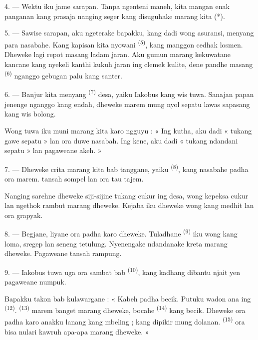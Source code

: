4. --- Wektu iku jame sarapan. Tanpa ngenteni maneh, kita mangan enak
panganan kang prasaja nanging seger kang disuguhake marang kita (*).

\VUsaut{3.0mm}
\VUsaut{3.0mm}

5. --- Sawise sarapan, aku ngeterake bapakku, kang dadi wong asuransi,
menyang para nasabahe. Kang kapisan kita nyowani 
\textsuperscript{(5)}, kang manggon cedhak losmen. Dheweke lagi repot
masang ladam jaran. Aku gumun marang kekuwatane kancane kang nyekeli
kanthi kukuh  jaran ing clemek kulite, dene pandhe masang
 \textsuperscript{(6)} nganggo gebugan palu kang santer.

6. --- Banjur kita menyang  \textsuperscript{(7)}
desa, yaiku Iakobus kang wis tuwa. Sanajan papan jenenge nganggo
 kang endah, dheweke marem mung nyol sepatu lawas
sapasang kang wis bolong.

Wong tuwa iku muni marang kita karo ngguyu : « Ing kutha, aku dadi
« tukang gawe sepatu » lan ora duwe nasabah. Ing kene, aku dadi
« tukang ndandani sepatu » lan pagaweane akeh. »

7. --- Dheweke crita marang kita bab tanggane, yaiku  \textsuperscript{(8)}, kang nasabahe padha ora marem.
 tansah sompel lan  ora tau
tajem.

Nanging sarehne dheweke siji-sijine tukang cukur ing desa, wong kepeksa
cukur lan ngethok rambut marang dheweke. Kejaba iku dheweke wong kang
medhit lan ora grapyak.

8. --- Begjane,  liyane ora padha karo dheweke. Tuladhane
 \textsuperscript{(9)} iku wong kang loma, sregep lan
seneng tetulung. Nyenengake ndandanake kreta marang dheweke.
Pagaweane tansah rampung.

9. --- Iakobus tuwa uga ora sambat bab 
\textsuperscript{(10)}, kang kadhang dibantu njait 
yen pagaweane numpuk.

Bapakku takon bab kulawargane : « Kabeh padha becik. Putuku wadon ana
ing  \textsuperscript{(12)}. 
\textsuperscript{(13)} marem banget marang dheweke, bocahe 
\textsuperscript{(14)} kang becik. Dheweke ora padha karo anakku lanang
kang mbeling ; kang dipikir mung dolanan. 
\textsuperscript{(15)} ora bisa nulari kawruh apa-apa marang dheweke. »

